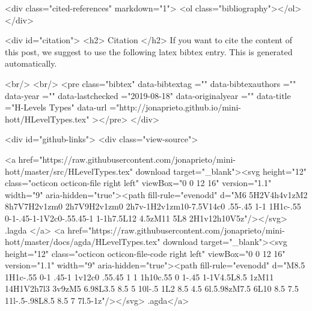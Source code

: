  <div class="cited-references" markdown="1">
  <ol class="bibliography"></ol>
  </div>


  
  <div id="citation">
  <h2> Citation </h2>
  If you want to cite the content of this post,
  we suggest to use the following latex bibtex entry.
  This is generated automatically.

  <br/>
  <br/>
  <pre class="bibtex"
       data-bibtextag =""
       data-bibtexauthors =""
       data-year =""
       data-lastchecked ="2019-08-18"
       data-originalyear =""
       data-title ="H-Levels Types"
       data-url ="http://jonaprieto.github.io/mini-hott/HLevelTypes.tex"
  ></pre>
  </div>
  

  <div id="github-links">
    <div class="view-source">
      
        <a href="https://raw.githubusercontent.com/jonaprieto/mini-hott/master/src/HLevelTypes.tex" download target="_blank"><svg height="12" class="octicon octicon-file right left" viewBox="0 0 12 16" version="1.1" width="9" aria-hidden="true"><path fill-rule="evenodd" d="M6 5H2V4h4v1zM2 8h7V7H2v1zm0 2h7V9H2v1zm0 2h7v-1H2v1zm10-7.5V14c0 .55-.45 1-1 1H1c-.55 0-1-.45-1-1V2c0-.55.45-1 1-1h7.5L12 4.5zM11 5L8 2H1v12h10V5z"/></svg> .lagda </a>
        <a href="https://raw.githubusercontent.com/jonaprieto/mini-hott/master/docs/agda/HLevelTypes.tex" download target="_blank"><svg height="12" class="octicon octicon-file-code right left" viewBox="0 0 12 16" version="1.1" width="9" aria-hidden="true"><path fill-rule="evenodd" d="M8.5 1H1c-.55 0-1 .45-1 1v12c0 .55.45 1 1 1h10c.55 0 1-.45 1-1V4.5L8.5 1zM11 14H1V2h7l3 3v9zM5 6.98L3.5 8.5 5 10l-.5 1L2 8.5 4.5 6l.5.98zM7.5 6L10 8.5 7.5 11l-.5-.98L8.5 8.5 7 7l.5-1z"/></svg> .agda</a>
      
